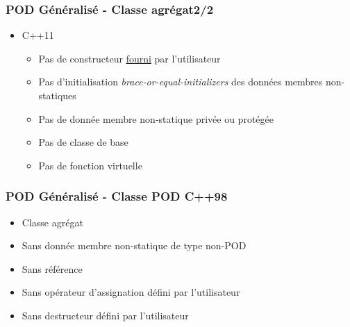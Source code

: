 \documentclass[C++.tex]{subfiles}
\begin{document}
\begin{frame}[fragile]
	\frametitle{POD Généralisé - Classe agrégat\titlehfill{}2/2}
	\begin{itemize}

		\item C++11
		\begin{itemize}
			\item Pas de constructeur \underline{fourni} par l'utilisateur


			\item Pas d'initialisation \textit{brace-or-equal-initializers} des données membres non-statiques
			\item Pas de donnée membre non-statique privée ou protégée
			\item Pas de classe de base
			\item Pas de fonction virtuelle
		\end{itemize}
	\end{itemize}
\end{frame}

\begin{frame}[fragile]
	\frametitle{POD Généralisé - Classe POD C++98}
	\begin{itemize}
		\item Classe agrégat
		\item Sans donnée membre non-statique de type non-POD
		\item Sans référence
		\item Sans opérateur d'assignation défini par l'utilisateur
		\item Sans destructeur défini par l'utilisateur
	\end{itemize}
\end{frame}
\end{document}
